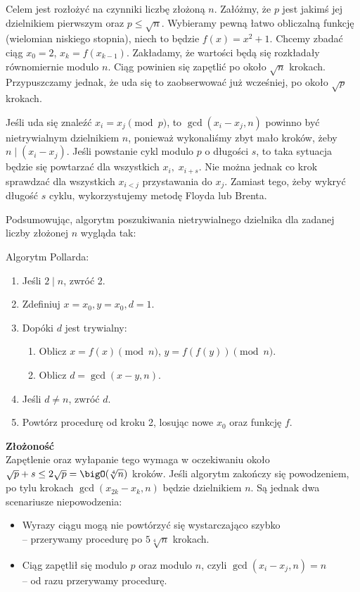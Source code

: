 Celem jest rozłożyć na czynniki liczbę złożoną \( n \). Załóżmy, że \( p \) jest jakimś jej dzielnikiem pierwszym oraz \( p \leq \sqrt{n} \).
Wybieramy pewną łatwo obliczalną funkcję (wielomian niskiego stopnia), niech to będzie \( f(x) = x^2 + 1 \). Chcemy zbadać ciąg \( x_0 = 2 \), \( x_k = f(x_{k-1}) \).
Zakładamy, że wartości będą się rozkładały równomiernie modulo \( n \). Ciąg powinien się zapętlić po około \( \sqrt{n} \) krokach. Przypuszczamy jednak, że uda się to zaobserwować już wcześniej, po około \( \sqrt{p} \) krokach.

Jeśli uda się znaleźć \( x_i = x_j \pmod{p} \), to \( \gcd(x_i - x_j, n) \) powinno być nietrywialnym dzielnikiem \( n \), ponieważ wykonaliśmy zbyt mało kroków, żeby \( n \mid (x_i - x_j) \).
Jeśli powstanie cykl modulo \( p \) o długości \( s \), to taka sytuacja będzie się powtarzać dla wszystkich \( x_i,\; x_{i+s} \). Nie można jednak co krok sprawdzać dla wszystkich \( x_{i<j} \) przystawania do \( x_j \).
Zamiast tego, żeby wykryć długość \( s \) cyklu, wykorzystujemy metodę Floyda lub Brenta.

Podsumowując, algorytm poszukiwania nietrywialnego dzielnika dla zadanej liczby złożonej \( n \) wygląda tak:
\begin{greyframe}
    Algorytm Pollarda:
    \begin{enumerate}
        \item Jeśli \( 2 \mid n \), zwróć 2.
        \item Zdefiniuj \( x = x_0, y = x_0, d = 1 \).
        \item Dopóki \( d \) jest trywialny:
        \begin{enumerate}
            \item Oblicz \( x = f(x) \pmod{n} \), \( y = f(f(y)) \pmod{n} \).
            \item Oblicz \( d = \gcd(x-y, n) \).
        \end{enumerate}
        \item Jeśli \( d \neq n \), zwróć \( d \).
        \item Powtórz procedurę od kroku 2, losując nowe \( x_0 \) oraz funkcję \( f \).
    \end{enumerate}
\end{greyframe}

\textbf{Złożoność} \\
Zapętlenie oraz wyłapanie tego wymaga w oczekiwaniu około \( \sqrt{p} + s \leq 2\sqrt{p} = \bigO(\sqrt[4]{n}) \) kroków. Jeśli algorytm zakończy się powodzeniem, po tylu krokach \( \gcd(x_{2k} - x_k, n )\) będzie dzielnikiem \( n \).
Są jednak dwa scenariusze niepowodzenia:
\begin{itemize}
    \item Wyrazy ciągu mogą nie powtórzyć się wystarczająco szybko \\
    -- przerywamy procedurę po \( 5\sqrt[4]{n} \) krokach.
    \item Ciąg zapętlił się modulo \( p \) oraz modulo \( n \), czyli \( \gcd(x_i - x_j, n) = n \) \\
    -- od razu przerywamy procedurę.
\end{itemize}

